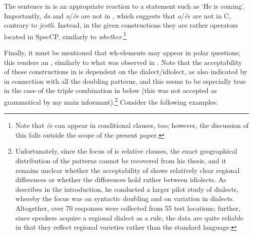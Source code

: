 \documentclass[output=paper,modfonts, hidelinks, newtxmath]{langscibook}
\begin{document}
\newpage
\noindent The sentence in  is an appropriate reaction to a statement such as `He is coming'. Importantly, \textit{da} and \textit{a}/\textit{če} are not in , which suggests that \textit{a}/\textit{če} are not in C, contrary to  \textit{jestli}. Instead, in the given constructions they are rather operators located in SpecCP, similarly to  \textit{whether}.\footnote{Note that \textit{če} can appear in conditional clauses, too; however, the discussion of this falls outside the scope of the present paper.}

Finally, it must be mentioned that wh-elements may appear in polar questions; this renders an , similarly to what was observed in . Note that the acceptability of these constructions in  is dependent on the dialect/idiolect, as also indicated by \citet{hladnik2010} in connection with all the doubling patterns, and this seems to be especially true in the case of the triple combination in  below (this was not accepted as grammatical by my main informant).\footnote{Unfortunately, since the focus of \citet{hladnik2010} is relative clauses, the exact geographical distribution of the  patterns cannot be recovered from his thesis, and it remains unclear whether the acceptability of  shows relatively clear regional differences or whether the differences hold rather between idiolects. As \citet[6--8]{hladnik2010} describes in the introduction, he conducted a larger pilot study of  dialects, whereby the focus was on syntactic doubling and on variation in dialects. Altogether, over 70 responses were collected from 55 test locations; further, since  speakers acquire a regional dialect as a rule, the data are quite reliable in that they reflect regional varieties rather than the standard language.} Consider the following examples:

\ea \label{polarecho}
	\z
\z
\end{document}
